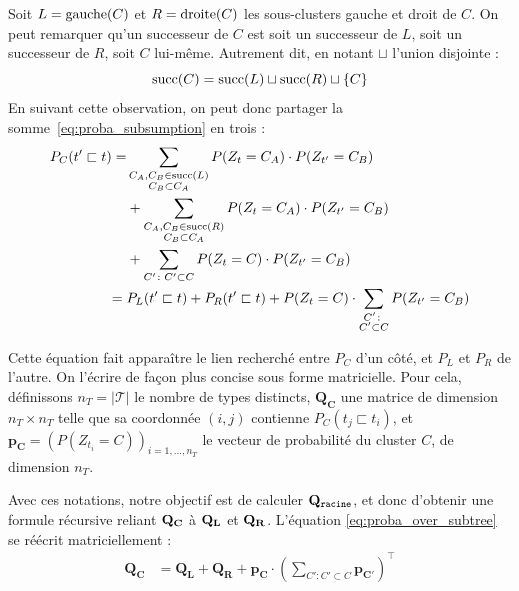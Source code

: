 Soit $L = \gauche(C)$ et $R = \droite(C)$ les sous-clusters gauche et droit de $C$. On peut remarquer qu'un successeur de $C$ est soit un successeur de $L$, soit un successeur de $R$, soit $C$ lui-même. Autrement dit, en notant $\sqcup$ l'union disjointe :
\begin{equation}
    \succs(C) = \succs(L) \sqcup \succs(R) \sqcup \{ C\}
\end{equation}
En suivant cette observation, on peut donc partager la somme~\ref{eq:proba_subsumption} en trois :
\begin{align}
P_{C}(t' \sqsubset t) = 
&
\sum_{\substack{C_A, C_B \in \succs(L) \\  C_B \subset C_A}} P(Z_t = C_A)\cdot P(Z_{t'} = C_B) 
\nonumber \\ 
&+ 
\sum_{\substack{C_A, C_B \in \succs(R) \\  C_B \subset C_A}} P(Z_t = C_A)\cdot P(Z_{t'} = C_B) 
\nonumber \\
&+ \displaystyle \sum_{C' \colon C' \subset C} P(Z_t = C) \cdot P(Z_{t'} = C_B) \nonumber \\
= {} & P_{L}(t' \sqsubset t) + P_{R}(t' \sqsubset t)  + P(Z_t=C)\cdot\sum_{\substack{C' \colon \\ C' \subset C}} P(Z_{t'} = C_B)
\label{eq:proba_over_subtree}
\end{align}

Cette équation fait apparaître le lien recherché entre $P_C$ d'un côté, et $P_L$ et $P_R$ de l'autre. On l'écrire de façon plus concise sous forme matricielle. Pour cela, définissons $n_T = | \mathcal{T} |$ le nombre de types distincts, $\mathbf{Q_C}$ une matrice de dimension $n_T \times n_T$ telle que sa coordonnée $(i, j)$ contienne $P_C(t_j \sqsubset t_i)$, et $\mathbf{p_C} = \left(P(Z_{t_i} = C)\right)_{i = 1, \ldots, n_T}$ le vecteur de probabilité du cluster $C$, de dimension $n_T$. 

Avec ces notations, notre objectif est de calculer $\bf{Q_\texttt{racine}}$, et donc d'obtenir une formule récursive reliant $\bf{Q_C}$ à $\bf{Q_L}$ et $\bf{Q_R}$. L'équation \ref{eq:proba_over_subtree} se réécrit matriciellement :
\begin{align}
    \mathbf{Q_C} &= \mathbf{Q_L} + \mathbf{Q_R} + \mathbf{p_C} \cdot \left(\sum_{C' \colon C' \subset C} \mathbf{p_{C'}} \right)^\top 
    \label{eq:recursive_q_formula}
\end{align}


